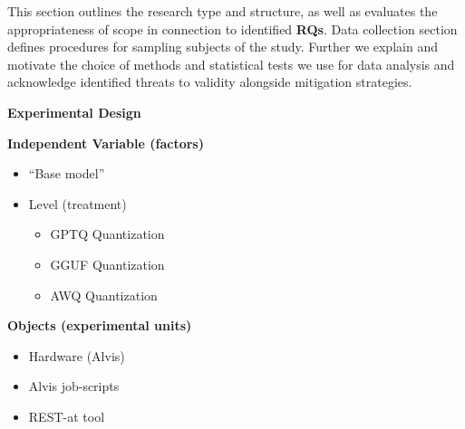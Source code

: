 \documentclass[conference]{IEEEtran}
\begin{document}
This section outlines the research type and structure, as well as evaluates the
appropriateness of scope in connection to identified \textbf{RQs}. Data
collection section defines procedures for sampling subjects of the study.
Further we explain and motivate the choice of methods and statistical tests we
use for data analysis and acknowledge identified threats to validity alongside
mitigation strategies.

\begin{center}
   \begin{center}
        \textbf{Experimental Design}
    \end{center}
    \begin{tcbraster}[raster columns=2, raster column skip=5pt, raster equal height=rows, raster row skip=5pt]
        \begin{roundedBox}
            \centering
            \textbf{Independent Variable (factors)}
            \begin{itemize}
                \item ``Base model''
                \item Level (treatment)
                    \begin{itemize}
                        \item GPTQ Quantization
                        \item GGUF Quantization
                        \item AWQ Quantization %
                    \end{itemize}
            \end{itemize}
        \end{roundedBox}
        \begin{roundedBox}
            \centering
            \textbf{Objects (experimental units)}
            \begin{itemize}
                \item Hardware (Alvis)
                \item Alvis job-scripts
                \item REST-at tool
            \end{itemize}
        \end{roundedBox}
        \begin{roundedBox}
            \centering

\end{roundedBox}
\end{tcbraster}
\end{center}
\end{document}

